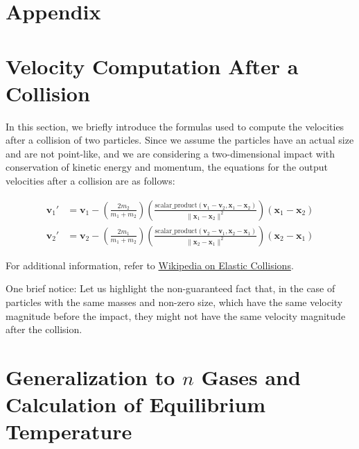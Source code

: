 \documentclass{article}
\begin{document}
\appendix
\section*{Appendix}
\section{Velocity Computation After a Collision}

In this section, we briefly introduce the formulas used to compute the velocities after a collision of two particles. Since we assume the particles have an actual size and are not point-like, and we are considering a two-dimensional impact with conservation of kinetic energy and momentum, the equations for the output velocities after a collision are as follows:

\begin{align}
    \mathbf{v}_1' &= \mathbf{v}_1 - \left( \frac{2m_2}{m_1 + m_2} \right) \left( \frac{\text{scalar\_product}(\mathbf{v}_1 - \mathbf{v}_2, \mathbf{x}_1 - \mathbf{x}_2)}{\|\mathbf{x}_1 - \mathbf{x}_2\|^2} \right) (\mathbf{x}_1 - \mathbf{x}_2) \\
    \mathbf{v}_2' &= \mathbf{v}_2 - \left( \frac{2m_1}{m_1 + m_2} \right) \left( \frac{\text{scalar\_product}(\mathbf{v}_2 - \mathbf{v}_1, \mathbf{x}_2 - \mathbf{x}_1)}{\|\mathbf{x}_2 - \mathbf{x}_1\|^2} \right) (\mathbf{x}_2 - \mathbf{x}_1)
\end{align}

For additional information, refer to \href{https://en.wikipedia.org/wiki/Elastic_collision}{Wikipedia on Elastic Collisions}.

One brief notice: Let us highlight the non-guaranteed fact that, in the case of particles with the same masses and non-zero size, which have the same velocity magnitude before the impact, they might not have the same velocity magnitude after the collision.


\section{Generalization to $n$ Gases and Calculation of Equilibrium Temperature}
\label{sec:appendix}
\end{document}
